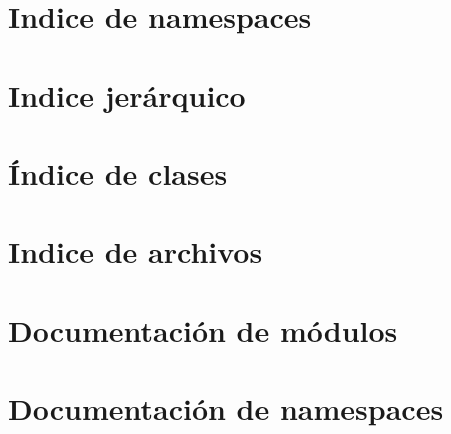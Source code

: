 \let\mypdfximage\pdfximage\def\pdfximage{\immediate\mypdfximage}\documentclass[twoside]{book}
\newcommand{\+}{\discretionary{\mbox{\scriptsize$\hookleftarrow$}}{}{}}
\begin{document}
\chapter{Indice de namespaces}

\chapter{Indice jerárquico}

\chapter{Índice de clases}

\chapter{Indice de archivos}

\chapter{Documentación de módulos}
















\chapter{Documentación de namespaces}

\end{document}
